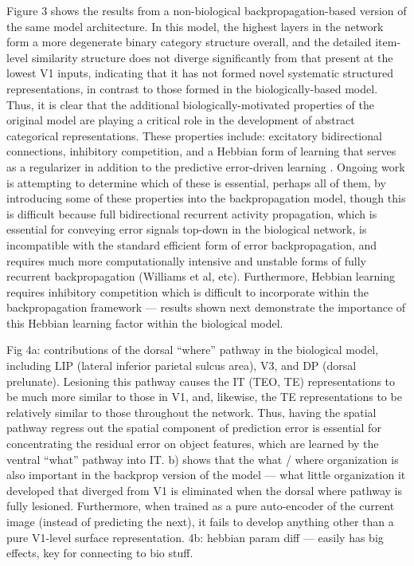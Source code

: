 \documentclass[11pt,twoside]{article}
\newif\myifpdf
\begin{document}
Figure 3 shows the results from a non-biological backpropagation-based version of the same model architecture.  In this model, the highest layers in the network form a more degenerate binary category structure overall, and the detailed item-level similarity structure does not diverge significantly from that present at the lowest V1 inputs, indicating that it has not formed novel systematic structured representations, in contrast to those formed in the biologically-based model.  Thus, it is clear that the additional biologically-motivated properties of the original model are playing a critical role in the development of abstract categorical representations. These properties include: excitatory bidirectional connections, inhibitory competition, and a Hebbian form of learning that serves as a regularizer in addition to the predictive error-driven learning \cite{OReilly98,OReillyMunakata00}.  Ongoing work is attempting to determine which of these is essential, perhaps all of them, by introducing some of these properties into the backpropagation model, though this is difficult because full bidirectional recurrent activity propagation, which is essential for conveying error signals top-down in the biological network, is incompatible with the standard efficient form of error backpropagation, and requires much more computationally intensive and unstable forms of fully recurrent backpropagation (Williams et al, etc).  Furthermore, Hebbian learning requires inhibitory competition which is difficult to incorporate within the backpropagation framework — results shown next demonstrate the importance of this Hebbian learning factor within the biological model.


Fig 4a: contributions of the dorsal “where” pathway in the biological model, including LIP (lateral inferior parietal sulcus area), V3, and DP (dorsal prelunate).  Lesioning this pathway causes the IT (TEO, TE) representations to be much more similar to those in V1, and, likewise, the TE representations to be relatively similar to those throughout the network.  Thus, having the spatial pathway regress out the spatial component of prediction error is essential for concentrating the residual error on object features, which are learned by the ventral “what” pathway into IT.  b) shows that the what / where organization is also important in the backprop version of the model — what little organization it developed that diverged from V1 is eliminated when the dorsal where pathway is fully lesioned.  Furthermore, when trained as a pure auto-encoder of the current image (instead of predicting the next), it fails to develop anything other than a pure V1-level surface representation.
4b: hebbian param diff — easily has big effects, key for connecting to bio stuff.
\end{document}

